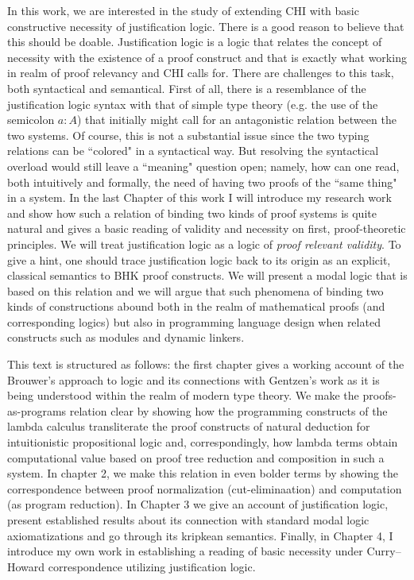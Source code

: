 In this work, we are interested in the study of  extending  \acrfull{CHI} with basic constructive  necessity of justification logic. There is a good reason to believe that this should be doable. Justification logic is a logic that relates the concept of necessity with the existence of a proof construct and that is exactly what working in  realm of proof relevancy and \ac{CHI} calls for. There are challenges to this task, both syntactical and  semantical. First of all, there is a resemblance of the justification logic syntax with that of simple type theory (e.g. the use of the semicolon $a:A$) that  initially might call for an antagonistic relation between the two systems. Of course, this is not a substantial issue since the two typing relations can be ``colored" in a syntactical way. But resolving the syntactical overload would still leave a  ``meaning" question open; namely, how can one read, both intuitively and formally, the need of having two proofs of the ``same thing" in a system. In the last Chapter of this work I will introduce my research work ~\cite{Pouliasis2016} and show how such a relation of binding two kinds of proof systems is quite natural and gives a basic reading of validity and necessity on first, proof-theoretic principles.  We will treat justification logic as a logic of \textit{proof relevant validity}. To give a hint, one should trace justification logic back to its origin as an explicit, classical semantics to \ac{BHK} proof constructs. We will present a modal logic that is based on this relation and we will argue that such phenomena of binding two kinds of constructions abound both in the realm  of mathematical proofs (and corresponding logics) but also in programming language design when related constructs such as modules and dynamic linkers.


This text is structured as follows: the first chapter gives a working account of the Brouwer's approach to logic and its connections with Gentzen's work as it is being understood within the realm of modern type theory. We make the proofs-as-programs relation clear by showing how the programming constructs of the lambda calculus transliterate the proof constructs of natural deduction for intuitionistic propositional logic and, correspondingly,  how lambda terms obtain  computational value based on  proof tree reduction and composition in such a system. In chapter 2, we make this relation in even bolder terms by showing the correspondence between proof normalization (cut-eliminaation) and computation (as program reduction). In Chapter 3 we give an account of justification logic, present established results about its connection with standard modal logic axiomatizations and go through its kripkean semantics. Finally, in Chapter 4, I introduce my own work in establishing a reading of basic necessity under Curry--Howard correspondence utilizing justification logic.

